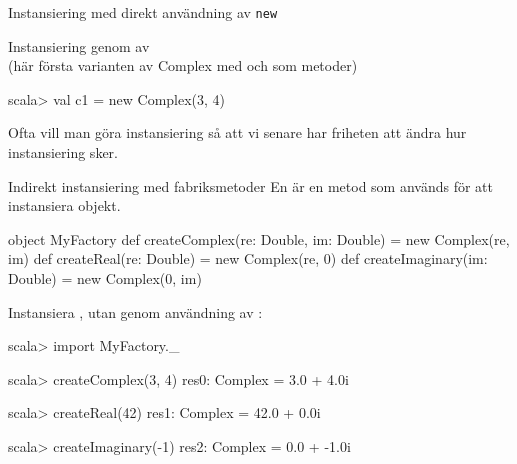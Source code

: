 \begin{Slide}{Instansiering med direkt användning av \texttt{new}}

Instansiering genom  av \\
{\SlideFontSmall (här första varianten av Complex med  och  som metoder)}
\begin{REPLnonum}
scala> val c1 = new Complex(3, 4)
\end{REPLnonum}
\pause
Ofta vill man göra  instansiering så att vi senare har friheten att ändra hur instansiering sker.
\end{Slide}



\begin{Slide}{Indirekt instansiering med fabriksmetoder}\SlideFontSmall
En  är en metod som används för att instansiera objekt.
\begin{Code}[basicstyle=\SlideFontSize{8}{12}\ttfamily\selectfont]
object MyFactory {
  def createComplex(re: Double, im: Double) = new Complex(re, im)
  def createReal(re: Double)                = new Complex(re, 0)
  def createImaginary(im: Double)           = new Complex(0, im)
}
\end{Code}
\pause
Instansiera , utan  genom användning av :
\begin{REPL}
scala> import MyFactory._

scala> createComplex(3, 4)
res0: Complex = 3.0 + 4.0i

scala> createReal(42)
res1: Complex = 42.0 + 0.0i

scala> createImaginary(-1)
res2: Complex = 0.0 + -1.0i
\end{REPL}
\end{Slide}




